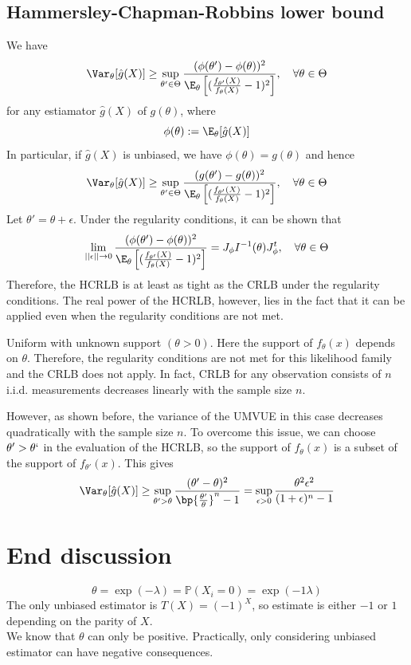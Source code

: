 \subsection{Hammersley-Chapman-Robbins lower bound}
We have
\[
    \Var_\theta[\hat{g}(X)] \geq \sup_{\theta' \in \Theta} \frac{(\phi(\theta')-\phi(\theta))^2}{\E_\theta\left[ (\frac{f_{\theta'}(X)}{f_\theta(X)} - 1)^2\right]}, \quad \forall\theta\in\Theta
\]
for any estiamator $\hat{g}(X)$ of $g(\theta)$, where
\[
    \phi(\theta) := \E_\theta[\hat{g}(X)]
\]
In particular, if $\hat{g}(X)$ is unbiased, we have $\phi(\theta) = g(\theta)$ and hence
\[
    \Var_\theta[\hat{g}(X)] \geq \sup_{\theta' \in \Theta} \frac{(g(\theta') - g(\theta))^2}{\E_\theta \left[(\frac{f_{\theta'}(X)}{f_\theta(X)}-1)^2 \right]}, \quad \forall\theta\in\Theta
\]
Let $\theta' = \theta + \epsilon$. Under the regularity conditions, it can be shown that
\[
    \lim_{||\epsilon|| \to 0} \frac{(\phi(\theta') - \phi(\theta))^2}{\E_\theta \left[(\frac{f_{\theta'}(X)}{f_\theta(X)}-1)^2 \right]} = J_\phi I^{-1} (\theta) J_\phi^t, \quad \forall\theta\in\Theta
\]
Therefore, the HCRLB is at least as tight as the CRLB under the regularity conditions. The real power of the HCRLB, however, lies in the fact that it can be applied even when the regularity conditions are not met.

\begin{exmp}
    Uniform with unknown support $(\theta > 0)$. Here the support of $f_\theta(x)$ depends on $\theta$. Therefore, the regularity
    conditions are not met for this likelihood family and the CRLB does not apply. In fact, CRLB for any observation consists of $n$ i.i.d. measurements decreases linearly
    with the sample size $n$.

    However, as shown before, the variance of the UMVUE in this case decreases
    quadratically with the sample size $n$. To overcome this issue, we can choose $\theta' > \theta`$
    in the evaluation of the HCRLB, so the support of $f_\theta(x)$ is a subset of the support of $f_{\theta'}(x)$. This gives
    \[
        \Var_\theta[\hat{g}(X)] \geq \sup_{\theta' > \theta} \frac{(\theta' - \theta)^2}{\bp{\frac{\theta'}{\theta}}^n - 1} = \sup_{\epsilon > 0} \frac{\theta^2\epsilon^2}{(1+\epsilon)^n - 1}
    \]
\end{exmp}

\section{End discussion}

\[
    \theta = \exp(-\lambda) = \mathbb{P}(X_i = 0) = \exp(-1 \lambda)
\]
The only unbiased estimator is $T(X) = (-1)^X$, so estimate is either $-1$ or $1$ depending on the parity of $X$. \\

\noindent We know that $\theta$ can only be positive. Practically, only considering unbiased estimator can have negative consequences.